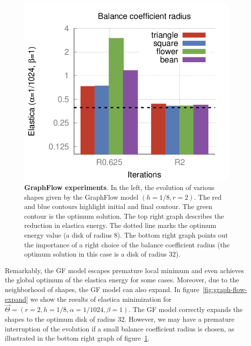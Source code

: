 \documentclass[smallextended]{svjour3}
\begin{document}
\begin{figure}
\begin{minipage}{0.75\textwidth}
\includegraphics[scale=0.22]{figures/shape-flow/plots/bars.png}
\end{minipage}
\caption{\textbf{GraphFlow experiments}. In the left, the evolution of various shapes given by the GraphFlow model $(h=1/8,r=2)$. The red and blue contours highlight initial and final contour. The green contour is the optimum solution. The top right graph describes the reduction in elastica energy. The dotted line marks the optimum energy value (a disk of radius $8$). The bottom right graph points out the importance of a right choice of the balance coefficient radius (the optimum solution in this case is a disk of radius 32).}
\label{fig:graph-flow-experiments}
\end{figure}

Remarkably, the GF model escapes premature local minimum and even achieves the global optimum of the elastica energy for some cases. Moreover, due to the neighborhood of shapes, the GF model can also expand. In figure~\ref{fig:graph-flow-expand} we show the results of elastica minimization for $\vec{\Theta} = ( r=2,h=1/8,\alpha=1/1024,\beta=1 )$. The GF model correctly expands the shapes to the optimum disk of radius $32$. However, we may have a premature interruption of the evolution if a small balance coefficient radius is chosen, as illustrated in the bottom right graph of figure~\ref{fig:graph-flow-experiments}.
\end{document}
